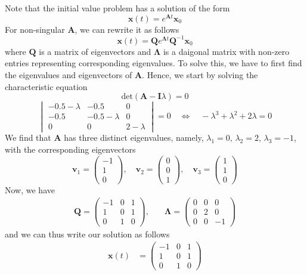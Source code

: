 \documentclass[12pt]{article}
\begin{document}
\begin{enumerate}
Note that the initial value problem has a solution of the form
\[
    \mathbf{x}(t) = e^{\mathbf{A}t} \mathbf{x}_{0}
\]
For non-singular $\mathbf{A}$, we can rewrite it as follows
$$\mathbf{x}(t)=\mathbf{Q}e^{\mathbf{\Lambda} t}\mathbf{Q}^{-1}\mathbf{x}_{0}$$
where $\mathbf{Q}$ is a matrix of eigenvectors and $\mathbf \Lambda$ is a daigonal matrix with non-zero entries representing corresponding eigenvalues.
To solve this, we have to first find the eigenvalues and eigenvectors of $\mathbf{A}$. 
Hence, we start by solving the characteristic equation
\[
    \text{det}\left(\mathbf{A} - \mathbf{I}\lambda\right) = 0
\]
\[
\begin{vmatrix} -0.5 - \lambda & -0.5 & 0\\ -0.5 & -0.5 - \lambda & 0\\ 0 & 0 & 2-\lambda \end{vmatrix}
    = 0 \quad \iff \quad -\lambda^{3} + \lambda^{2} + 2\lambda = 0
\]
We find that $\mathbf{A}$ has three distinct eigenvalues, namely, $\lambda_{1}=0, \, \lambda_{2}=2, \, \lambda_{3}=-1$, with 
the corresponding eigenvectors
\[
\mathbf{v}_{1}=\begin{pmatrix} -1\\ 1\\ 0 \end{pmatrix}, \quad \mathbf{v}_{2}=\begin{pmatrix} 0\\ 0\\ 1 \end{pmatrix}, \quad \mathbf{v}_{3}=\begin{pmatrix} 1\\ 1\\ 0 \end{pmatrix}
\]
Now, we have
\begin{align*}
    \mathbf{Q}=\begin{pmatrix} -1 & 0 & 1\\ 1 & 0 & 1\\ 0 & 1 & 0 \end{pmatrix}, & \quad \mathbf{\Lambda} = \begin{pmatrix} 0 & 0 & 0\\ 0 & 2 & 0\\ 0 & 0 & -1 \end{pmatrix}
\end{align*}
and we can thus write our solution as follows
\begin{align*}
\mathbf{x}(t) &= \begin{pmatrix} -1 & 0 & 1\\ 1 & 0 & 1\\ 0 & 1 & 0 \end{pmatrix}

\end{align*}
\end{enumerate}
\end{document}
